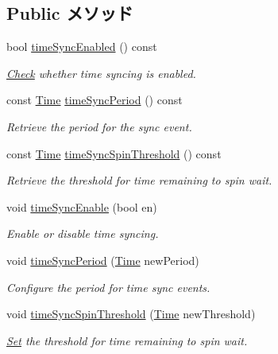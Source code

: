 \subsection*{Public メソッド}
\begin{DoxyCompactItemize}
\item 
bool \hyperlink{classRoot_a7ca6e6b75b6eeb4aa20e46edce0ac6de}{timeSyncEnabled} () const 
\begin{DoxyCompactList}\small\item\em \hyperlink{classCheck}{Check} whether time syncing is enabled. \item\end{DoxyCompactList}\item 
const \hyperlink{classTime}{Time} \hyperlink{classRoot_a830a76b9f0c3aea17ec77cd0e5011ad6}{timeSyncPeriod} () const 
\begin{DoxyCompactList}\small\item\em Retrieve the period for the sync event. \item\end{DoxyCompactList}\item 
const \hyperlink{classTime}{Time} \hyperlink{classRoot_a6528f63bdbdbc8055bbc6b8e34155c31}{timeSyncSpinThreshold} () const 
\begin{DoxyCompactList}\small\item\em Retrieve the threshold for time remaining to spin wait. \item\end{DoxyCompactList}\item 
void \hyperlink{classRoot_ad966d7a16083475060291e68ac9c9e24}{timeSyncEnable} (bool en)
\begin{DoxyCompactList}\small\item\em Enable or disable time syncing. \item\end{DoxyCompactList}\item 
void \hyperlink{classRoot_ac3f63e1a46d7fb3cc8d11ddbb148b65b}{timeSyncPeriod} (\hyperlink{classTime}{Time} newPeriod)
\begin{DoxyCompactList}\small\item\em Configure the period for time sync events. \item\end{DoxyCompactList}\item 
void \hyperlink{classRoot_a2424f9c13e5cf005bc79fbaf431ca660}{timeSyncSpinThreshold} (\hyperlink{classTime}{Time} newThreshold)
\begin{DoxyCompactList}\small\item\em \hyperlink{classSet}{Set} the threshold for time remaining to spin wait. \item\end{DoxyCompactList}\item 

\end{DoxyCompactItemize}

